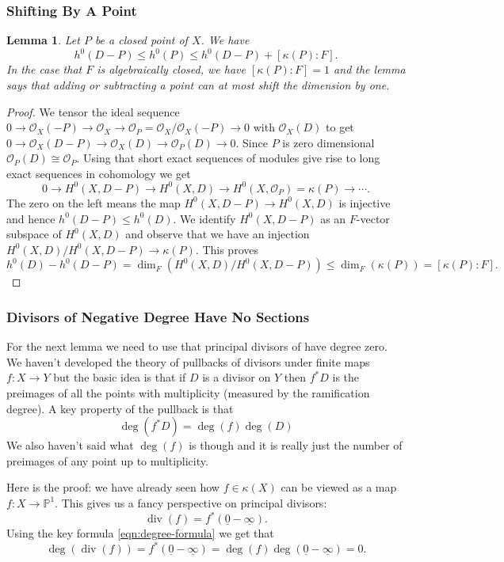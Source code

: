 \documentclass[12pt]{article}
\numberwithin{equation}{section}
\newtheorem{lemma}[theorem]{Lemma}
\theoremstyle{definition}
\theoremstyle{remark}
\newcommand{\Ocal}{\mathcal{O}}
\newcommand{\PP}{\mathbb{P}}
\renewcommand{\div}{\operatorname{div}}
\begin{document}
\subsubsection{Shifting By A Point}
\begin{lemma}
Let $P$ be a closed point of $X$. 
We have 
 $$ h^0(D-P) \leq h^0(P) \leq h^0(D-P) + [\kappa(P):F].$$
In the case that $F$ is algebraically closed, we have $[\kappa(P):F]=1$ and the lemma says that adding or subtracting a point can at most shift the dimension by one.
\end{lemma}
\begin{proof}
	We tensor the ideal sequence $0 \to \Ocal_X(-P) \to \Ocal_X \to \Ocal_P=\Ocal_X/\Ocal_X(-P) \to 0$ with $\Ocal_X(D)$ to get $0 \to \Ocal_X(D-P) \to \Ocal_X(D) \to \Ocal_P(D) \to 0$. 
	Since $P$ is zero dimensional $\Ocal_P(D) \cong \Ocal_P$. 
	Using that short exact sequences of modules give rise to long exact sequences in cohomology we get 
	 $$0 \to H^0(X,D-P) \to H^0(X,D) \to H^0(X,\Ocal_P) = \kappa(P) \to \cdots. $$
	The zero on the left means the map $H^0(X,D-P) \to H^0(X,D)$ is injective and hence $h^0(D-P) \leq h^0(D)$. 
	We identify $H^0(X,D-P)$ as an $F$-vector subspace of $H^0(X,D)$ and observe that we have an injection $H^0(X,D)/H^0(X,D-P) \to \kappa(P)$. 
	This proves 
	$$h^0(D) - h^0(D-P) = \dim_F(H^0(X,D)/H^0(X,D-P)) \leq \dim_F(\kappa(P)) = [\kappa(P):F].$$
\end{proof}

\subsubsection{Divisors of Negative Degree Have No Sections}
For the next lemma we need to use that principal divisors of have degree zero. 
We haven't developed the theory of pullbacks of divisors under finite maps $f:X\to Y$ but the basic idea is that if $D$ is a divisor on $Y$ then $f^*D$ is the preimages of all the points with multiplicity (measured by the ramification degree).
A key property of the pullback is that 
\begin{equation}\label{eqn:degree-formula}
\deg(f^*D)= \deg(f)\deg(D)
\end{equation}
We also haven't said what $\deg(f)$ is though and it is really just the number of preimages of any point up to multiplicity. 

Here is the proof: we have already seen how $f\in \kappa(X)$ can be viewed as a map $f:X\to \PP^1$. 
This gives us a fancy perspective on principal divisors:
 $$ \div (f) = f^*( \underline{0} - \underline{\infty}). $$
Using the key formula \eqref{eqn:degree-formula} we get that 
 $$\deg(\div(f))= f^*( \underline{0} - \underline{\infty}) = \deg(f) \deg(\underline{0} - \underline{\infty}) = 0.$$
\end{document}
